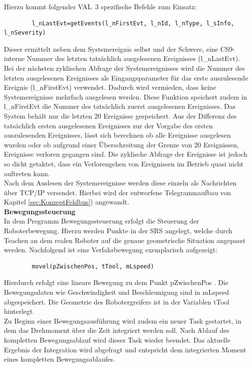 \documentclass[ a4paper,
                oneside,
                toc=bibliography,
                toc=listof
                ]{scrbook}
\begin{document}
	\noindent
	Hierzu kommt folgender VAL~3 spezifische Befehle zum Einsatz:
	\begin{lstlisting}
		l_nLastEvt=getEvents(l_nFirstEvt, l_nId, l_nType, l_sInfo, l_nSeverity)
	\end{lstlisting}
	Dieser ermittelt neben dem Systemereignis selbst und der Schwere, eine CS9-interne Nummer des letzten tatsächlich ausgelesenen Ereignisses (l\_nLastEvt).
	Bei der nächsten zyklischen Abfrage der Systemereignisses wird die Nummer des letzten ausgelesenen Ereignisses als Eingangsparameter für das erste auszulesende Ereignis (l\_nFirstEvt) verwendet. Dadurch wird vermieden, dass keine Systemereignisse mehrfach ausgelesen werden. Diese Funktion speichert zudem in l\_nFirstEvt die Nummer des tatsächlich zuerst ausgelesenen Ereignisses. Das System behält nur die letzten 20 Ereignisse gespeichert. Aus der Differenz des tatsächlich ersten ausgelesenen Ereignisses zur der Vorgabe des ersten auszulesenden Ereignisses, lässt sich berechnen ob alle Ereignisse ausgelesen wurden oder ob aufgrund einer Überschreitung der Grenze von 20 Ereignissen, Ereignisse verloren gegangen sind. Die zyklische Abfrage der Ereignisse ist jedoch so dicht getaktet, dass ein Verlorengehen von Ereignissen im Betrieb quasi nicht auftreten kann.\\
	Nach dem Auslesen der Systemereignisse werden diese einzeln als Nachrichten über TCP/IP versendet. Hierbei wird der entworfene Telegrammaufbau von Kapitel \ref{sec:KonzeptFeldbus}) angewandt.\vspace{0.5\baselineskip}\\
	\textbf{Bewegungssteuerung}\\
	In dem Programm Bewegungssteuerung erfolgt die Steuerung der Roboterbewegung. Hierzu werden Punkte in der SRS angelegt, welche durch Teachen an dem realen Roboter auf die genaue geometrische Situation angepasst werden. Nachfolgend ist eine Verfahrbewegung exemplarisch aufgezeigt:
	\begin{lstlisting}
		movel(pZwischenPos, tTool, mLspeed)
	\end{lstlisting}
	Hierdurch erfolgt eine lineare Bewegung zu dem Punkt \glqq pZwischenPos \grqq{}. Die Bewegungsdaten wie Geschwindigkeit und Beschleunigung sind in \glqq mLspeed \grqq{} abgespeichert. Die Geometrie des Robotergreifers ist in der Variablen \glqq tTool \grqq{} hinterlegt.\\
	Zu Beginn einer Bewegungsausführung wird zudem ein neuer Task gestartet, in dem das Drehmoment über die Zeit integriert werden soll. Nach Ablauf des kompletten Bewegungsablauf wird dieser Task wieder beendet. Das aktuelle Ergebnis der Integration wird abgefragt und entspricht dem integrierten Moment eines kompletten Bewegungsablaufes.\vspace{0.5\baselineskip}\\
\end{document}

